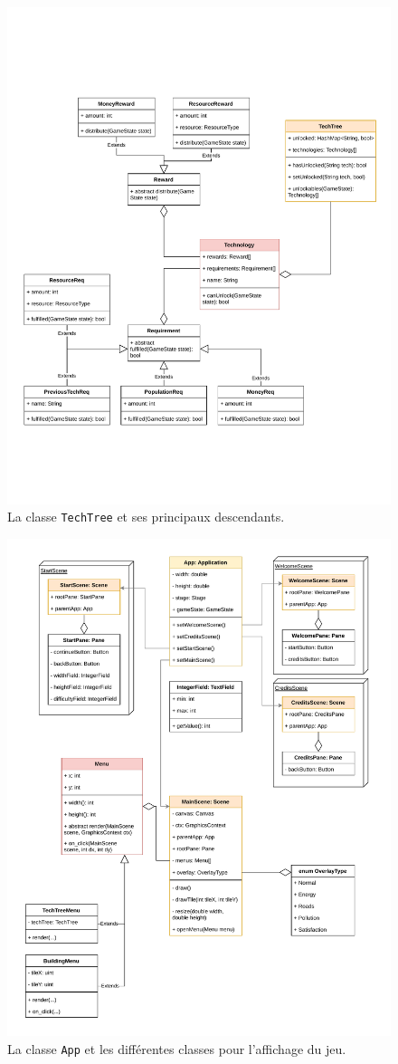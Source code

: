 \documentclass[12pt]{article}
\begin{document}
\begin{figure}[ht]
\includegraphics[width=\textwidth]{uml-classes-Page-5}
\caption{La classe \texttt{TechTree} et ses principaux descendants.\label{fig:techtree}}
\end{figure}

\begin{figure}[ht]
\includegraphics[width=\textwidth]{uml-classes-Page-6}
\caption{La classe \texttt{App} et les différentes classes pour l'affichage du jeu.\label{fig:application}}
\end{figure}
\end{document}
